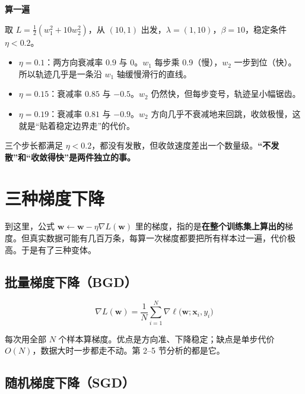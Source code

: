\documentclass[UTF8, a4paper, zihao=-4, fontset=none]{ctexart}
\begin{document}
\begin{examplebox}
{\bfseries\sffamily\small\color{black} 算一遍}\par\vspace{2pt}
取 $L=\frac12(w_1^2+10w_2^2)$，从 $(10,1)$ 出发，$\lambda=(1,10)$，$\beta=10$，稳定条件 $\eta<0.2$。


\begin{itemize}
\item $\eta=0.1$：两方向衰减率 $0.9$ 与 $0$。$w_1$ 每步乘 0.9（慢），$w_2$ 一步到位（快）。所以轨迹几乎是一条沿 $w_1$ 轴缓慢滑行的直线。
\item $\eta=0.15$：衰减率 $0.85$ 与 $-0.5$。$w_2$ 仍然快，但每步变号，轨迹呈小幅锯齿。
\item $\eta=0.19$：衰减率 $0.81$ 与 $-0.9$。$w_2$ 方向几乎不衰减地来回跳，收敛极慢，这就是“贴着稳定边界走”的代价。
\end{itemize}


三个步长都满足 $\eta<0.2$，都没有发散，但收敛速度差出一个数量级。\textbf{“不发散”和“收敛得快”是两件独立的事。}


\end{examplebox}




\section{三种梯度下降}



到这里，公式 $\mathbf{w}\leftarrow\mathbf{w}-\eta\nabla L(\mathbf{w})$ 里的梯度，指的是\textbf{在整个训练集上算出的}梯度。但真实数据可能有几百万条，每算一次梯度都要把所有样本过一遍，代价极高。于是有了三种变体。




\subsection{批量梯度下降（BGD）}


\[
\nabla L(\mathbf{w})=\frac{1}{N}\sum_{i=1}^{N}\nabla\ell\big(\mathbf{w};\mathbf{x}_i,y_i\big)
\]


每次用全部 $N$ 个样本算梯度。优点是方向准、下降稳定；缺点是单步代价 $O(N)$，数据大时一步都走不动。第 2–5 节分析的都是它。




\subsection{随机梯度下降（SGD）}
\end{document}
